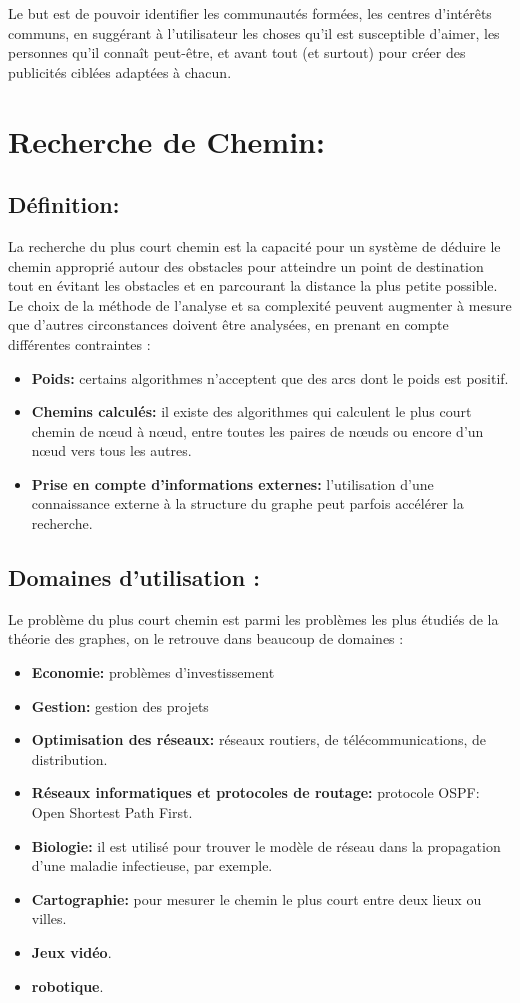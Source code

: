 Le but est de pouvoir identifier les communautés formées, les centres d'intérêts communs, en suggérant à l'utilisateur les choses qu'il est susceptible d'aimer, les personnes qu'il connaît peut-être, et avant tout (et surtout) pour créer des publicités ciblées adaptées à chacun.


\section{Recherche de Chemin:}

\subsection{Définition:}
La recherche du plus court chemin est la capacité pour un système de déduire le chemin approprié autour des obstacles pour atteindre un point de destination tout en évitant les obstacles et en parcourant la distance la plus petite possible.
Le choix de la méthode de l'analyse et sa complexité peuvent augmenter à mesure que d'autres circonstances doivent être analysées, en prenant en compte différentes contraintes :

\begin{itemize}
	\item \textbf{Poids:} certains algorithmes n'acceptent que des arcs dont le poids est positif.
	\item \textbf{Chemins calculés:} il existe des algorithmes qui calculent le plus court chemin de nœud à nœud, entre toutes les paires de nœuds ou encore d'un nœud vers tous les autres.
	\item \textbf{Prise en compte d'informations externes:} l'utilisation d'une connaissance externe à la structure du graphe peut parfois accélérer la recherche.
\end{itemize}

\subsection{Domaines d'utilisation :}
Le problème du plus court chemin est parmi les problèmes les plus étudiés de la théorie des graphes, on le retrouve dans beaucoup de domaines :
\begin{itemize}
\item\textbf{Economie:} problèmes d’investissement
\item\textbf{Gestion:} gestion des projets
\item\textbf{Optimisation des réseaux:} réseaux routiers, de télécommunications, de distribution.
\item\textbf{Réseaux informatiques et protocoles de routage:}   protocole OSPF: Open Shortest Path First.
\item\textbf{Biologie:} il est utilisé pour trouver le modèle de réseau dans la propagation d'une maladie infectieuse, par exemple.
\item\textbf{Cartographie:} pour mesurer le chemin le plus court entre deux lieux ou villes.
\item\textbf{Jeux vidéo}.
\item\textbf{robotique}.
\end{itemize}

